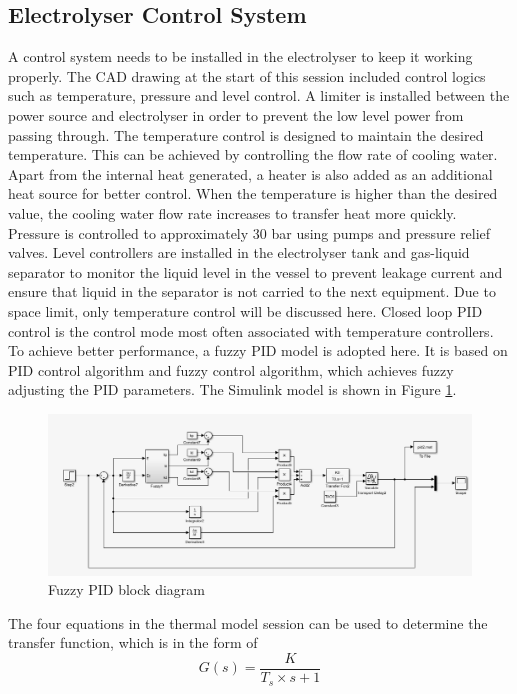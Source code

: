 \subsection{Electrolyser Control System}
A control system needs to be installed in the electrolyser to keep it working properly. The CAD drawing at the start of this session included control logics such as temperature, pressure and level control.  A limiter is installed between the power source and electrolyser in order to prevent the low level power from passing through. The temperature control is designed to maintain the desired temperature. This can be achieved by controlling the flow rate of cooling water. Apart from the internal heat generated, a heater is also added as an additional heat source for better control. When the temperature is higher than the desired value, the cooling water flow rate increases to transfer heat more quickly. Pressure is controlled to approximately 30 bar using pumps and pressure relief valves. Level controllers are installed in the electrolyser tank and gas-liquid separator to monitor the liquid level in the vessel to prevent leakage current and ensure that liquid in the separator is not carried to the next equipment. Due to space limit, only temperature control will be discussed here. Closed loop PID control is the control mode most often associated with temperature controllers.\cite{control} To achieve better performance, a fuzzy PID model is adopted here. It is based on PID control algorithm and fuzzy control algorithm, which achieves fuzzy adjusting the PID parameters.\cite{fuzzy} The Simulink model is shown in Figure \ref{fig:pid}. 
\begin{figure}[H]
\includegraphics[with=10cm]{fuzzypid.png}
\caption{Fuzzy PID block diagram}
\label{fig:pid}
\end{figure}
The four equations in the thermal model session can be used to determine the transfer function, which is in the form of 
\begin{equation}
G(s) = \frac{K}{T_s\times s +1} 
\end{equation}
